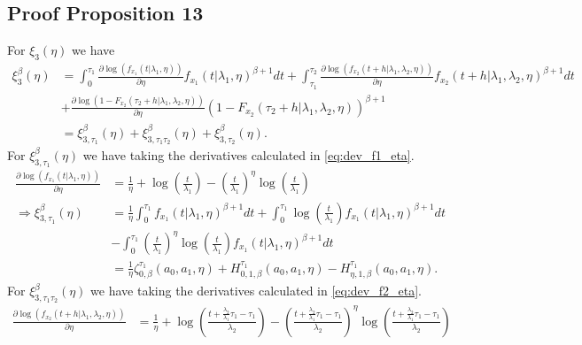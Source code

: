 \documentclass{article}
\begin{document}
\subsection{Proof Proposition 13}
For $\xi_3(\eta)$ we have
\begin{align*}
\xi_3^{\beta}(\eta)&=\int_{0}^{\tau_1}\frac{\partial \log\left(f_{x_1}(t|\lambda_1,\eta)\right)}{\partial \eta}f_{x_1}(t|\lambda_1,\eta)^{\beta+1}dt+\int_{\tau_1}^{\tau_2}\frac{\partial \log\left(f_{x_2}(t+h|\lambda_1,\lambda_2,\eta)\right)}{\partial \eta} f_{x_2}(t+h|\lambda_1,\lambda_2,\eta)^{\beta+1}dt
\\
&+\frac{\partial \log\left(1-F_{x_2}(\tau_2+h|\lambda_1,\lambda_2,\eta)\right)}{\partial \eta}\left(1-F_{x_2}(\tau_2+h|\lambda_1,\lambda_2,\eta)\right)^{\beta+1}
\\
&=\xi_{3,\tau_1}^{\beta}(\eta)+\xi_{3,\tau_1 \tau_2}^{\beta} (\eta)+ \xi_{3,\tau_2}^{\beta}(\eta).
\end{align*}
For $\xi_{3,\tau_1}^{\beta}(\eta)$ we have taking the derivatives calculated in \eqref{eq:dev_f1_eta}.
\begin{align*}
\frac{\partial \log\left(f_{x_1}(t|\lambda_1,\eta)\right)}{\partial \eta}&=\frac{1}{\eta}+\log\left(\frac{t}{\lambda_1}\right)-\left(\frac{t}{\lambda_1}\right)^{\eta}\log\left(\frac{t}{\lambda_1}\right)
\\
\Rightarrow  \xi_{3,\tau_1}^{\beta}(\eta)&=\frac{1}{\eta} \int_{0}^{\tau_1}f_{x_1}(t|\lambda_1,\eta)^{\beta+1}dt
+\int_{0}^{\tau_1}\log\left(\frac{t}{\lambda_1}\right)f_{x_1}(t|\lambda_1,\eta)^{\beta+1}dt
\\
&-\int_{0}^{\tau_1}\left(\frac{t}{\lambda_1}\right)^{\eta}\log\left(\frac{t}{\lambda_1}\right)f_{x_1}(t|\lambda_1,\eta)^{\beta+1}dt 
\\
&=\frac{1}{\eta}\zeta_{0,\beta}^{\tau_1}(a_0,a_1,\eta)+H_{0,1,\beta}^{\tau_1}(a_0,a_1,\eta)-H_{\eta,1,\beta}^{\tau_1}(a_0,a_1,\eta).
\end{align*}
For $\xi_{3,\tau_1\tau_2}^{\beta}(\eta)$ we have taking the derivatives calculated in \eqref{eq:dev_f2_eta}.
\begin{align*}
\frac{\partial \log\left(f_{x_2}(t+h|\lambda_1,\lambda_2,\eta)\right)}{\partial \eta}&=\frac{1}{\eta}+\log\left(\frac{t+\frac{\lambda_2}{\lambda_1}\tau_1-\tau_1}{\lambda_2}\right)-\left(\frac{t+\frac{\lambda_2}{\lambda_1}\tau_1-\tau_1}{\lambda_2}\right)^{\eta}\log\left(\frac{t+\frac{\lambda_2}{\lambda_1}\tau_1-\tau_1}{\lambda_2}\right)
\end{align*}
\end{document}
